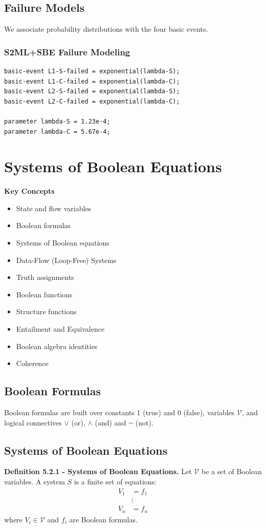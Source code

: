 \section{Failure Models}
We associate probability distributions with the four basic events.

\subsection{S2ML+SBE Failure Modeling}
\begin{lstlisting}
basic-event L1-S-failed = exponential(lambda-S);
basic-event L1-C-failed = exponential(lambda-C);
basic-event L2-S-failed = exponential(lambda-S);
basic-event L2-C-failed = exponential(lambda-C);

parameter lambda-S = 1.23e-4;
parameter lambda-C = 5.67e-4;
\end{lstlisting}

\chapter{Systems of Boolean Equations}

\textbf{Key Concepts}
\begin{itemize}
    \item State and flow variables
    \item Boolean formulas
    \item Systems of Boolean equations
    \item Data-Flow (Loop-Free) Systems
    \item Truth assignments
    \item Boolean functions
    \item Structure functions
    \item Entailment and Equivalence
    \item Boolean algebra identities
    \item Coherence
\end{itemize}

\section{Boolean Formulas}
Boolean formulas are built over constants 1 (true) and 0 (false), variables $\mathcal{V}$, and logical connectives $\vee$ (or), $\wedge$ (and) and $\neg$ (not).

\section{Systems of Boolean Equations}
\textbf{Definition 5.2.1 - Systems of Boolean Equations.} Let $\mathcal{V}$ be a set of Boolean variables. A system $S$ is a finite set of equations:
\begin{align*}
V_1 &= f_1 \\
&\vdots \\
V_n &= f_n
\end{align*}
where $V_i \in \mathcal{V}$ and $f_i$ are Boolean formulas.

